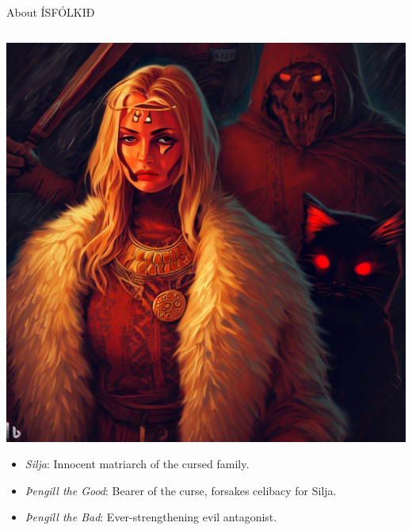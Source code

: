 \begin{frame}{About ÍSFÓLKIÐ}
\begin{columns}[T]
        \begin{column}{0.35\textwidth}
            \includegraphics[width=\textwidth]{../figures/dalle-ísfólkið}
            {\scriptsize\begin{itemize}
                \item \emph{Silja}: Innocent matriarch of the cursed family.
                \item \emph{Þengill the Good}: Bearer of the curse, forsakes celibacy for Silja.
                \item \emph{Þengill the Bad}: Ever-strengthening evil antagonist.
            \end{itemize}}
        \end{column}
    \end{columns}
\end{frame}

